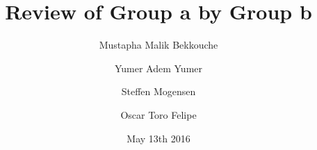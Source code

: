 \documentclass{article}
\title{\huge\sffamily\bfseries Review of Group a by Group b}
\author{ Mustapha Malik Bekkouche \and Yumer Adem Yumer \and Steffen Mogensen \and Oscar Toro Felipe}
\date{May 13th 2016}
\begin{document}
\maketitle


\tableofcontents
\pagebreak









\end{document}
